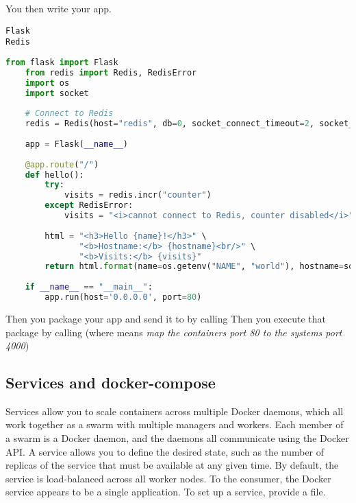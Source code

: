 You then write your app. 
\begin{lstlisting}[caption=requirements.txt]
Flask
Redis
\end{lstlisting}

\begin{lstlisting}[language=python, caption=main.py]
    from flask import Flask
    from redis import Redis, RedisError
    import os
    import socket
    
    # Connect to Redis
    redis = Redis(host="redis", db=0, socket_connect_timeout=2, socket_timeout=2)
    
    app = Flask(__name__)
    
    @app.route("/")
    def hello():
        try:
            visits = redis.incr("counter")
        except RedisError:
            visits = "<i>cannot connect to Redis, counter disabled</i>"
    
        html = "<h3>Hello {name}!</h3>" \
               "<b>Hostname:</b> {hostname}<br/>" \
               "<b>Visits:</b> {visits}"
        return html.format(name=os.getenv("NAME", "world"), hostname=socket.gethostname(), visits=visits)
    
    if __name__ == "__main__":
        app.run(host='0.0.0.0', port=80)
\end{lstlisting}
Then you package your app and send it to  by calling 
Then you execute that package by calling  (where  means \emph{map the containers port 80 to the systems port 4000})


\subsection{Services and docker-compose}

Services allow you to scale containers across multiple Docker daemons, which all work together as a swarm with multiple managers and workers. Each member of a swarm is a Docker daemon, and the daemons all communicate using the Docker API. A service allows you to define the desired state, such as the number of replicas of the service that must be available at any given time. By default, the service is load-balanced across all worker nodes. To the consumer, the Docker service appears to be a single application. 
To set up a service, provide a  file.

